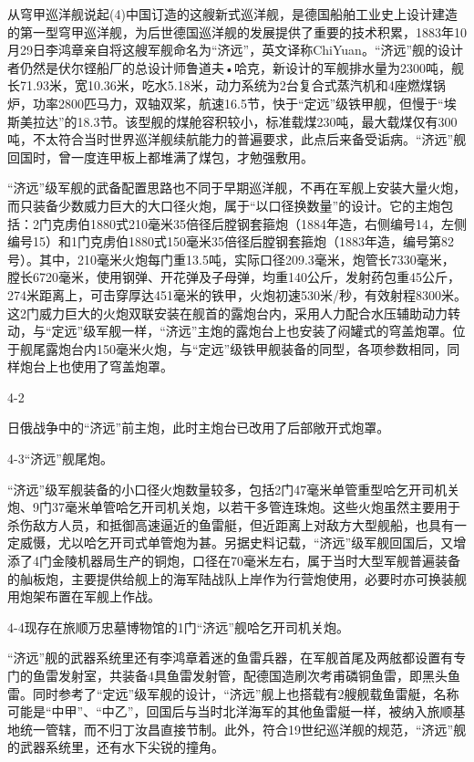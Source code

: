 \documentclass[12pt,UTF8]{ctexbook}
\begin{document}
从穹甲巡洋舰说起(4)中国订造的这艘新式巡洋舰，是德国船舶工业史上设计建造的第一型穹甲巡洋舰，为后世德国巡洋舰的发展提供了重要的技术积累，1883年10月29日李鸿章亲自将这艘军舰命名为“济远”，英文译称ChiYuan。“济远”舰的设计者仍然是伏尔铿船厂的总设计师鲁道夫•哈克，新设计的军舰排水量为2300吨，舰长71.93米，宽10.36米，吃水5.18米，动力系统为2台复合式蒸汽机和4座燃煤锅炉，功率2800匹马力，双轴双桨，航速16.5节，快于“定远”级铁甲舰，但慢于“埃斯美拉达”的18.3节。该型舰的煤舱容积较小，标准载煤230吨，最大载煤仅有300吨，不太符合当时世界巡洋舰续航能力的普遍要求，此点后来备受诟病。“济远”舰回国时，曾一度连甲板上都堆满了煤包，才勉强敷用。

“济远”级军舰的武备配置思路也不同于早期巡洋舰，不再在军舰上安装大量火炮，而只装备少数威力巨大的大口径火炮，属于“以口径换数量”的设计。它的主炮包括：2门克虏伯1880式210毫米35倍径后膛钢套箍炮（1884年造，右侧编号14，左侧编号15）和1门克虏伯1880式150毫米35倍径后膛钢套箍炮（1883年造，编号第82号）。其中，210毫米火炮每门重13.5吨，实际口径209.3毫米，炮管长7330毫米，膛长6720毫米，使用钢弹、开花弹及子母弹，均重140公斤，发射药包重45公斤，274米距离上，可击穿厚达451毫米的铁甲，火炮初速530米/秒，有效射程8300米。这2门威力巨大的火炮双联安装在舰首的露炮台内，采用人力配合水压辅助动力转动，与“定远”级军舰一样，“济远”主炮的露炮台上也安装了闷罐式的穹盖炮罩。位于舰尾露炮台内150毫米火炮，与“定远”级铁甲舰装备的同型，各项参数相同，同样炮台上也使用了穹盖炮罩。

4-2

日俄战争中的“济远”前主炮，此时主炮台已改用了后部敞开式炮罩。

4-3“济远”舰尾炮。

“济远”级军舰装备的小口径火炮数量较多，包括2门47毫米单管重型哈乞开司机关炮、9门37毫米单管哈乞开司机关炮，以若干多管连珠炮。这些火炮虽然主要用于杀伤敌方人员，和抵御高速逼近的鱼雷艇，但近距离上对敌方大型舰船，也具有一定威慑，尤以哈乞开司式单管炮为甚。另据史料记载，“济远”级军舰回国后，又增添了4门金陵机器局生产的铜炮，口径在70毫米左右，属于当时大型军舰普遍装备的舢板炮，主要提供给舰上的海军陆战队上岸作为行营炮使用，必要时亦可换装舰用炮架布置在军舰上作战。

4-4现存在旅顺万忠墓博物馆的1门“济远”舰哈乞开司机关炮。

“济远”舰的武器系统里还有李鸿章着迷的鱼雷兵器，在军舰首尾及两舷都设置有专门的鱼雷发射室，共装备4具鱼雷发射管，配德国造刷次考甫磷铜鱼雷，即黑头鱼雷。同时参考了“定远”级军舰的设计，“济远”舰上也搭载有2艘舰载鱼雷艇，名称可能是“中甲”、“中乙”，回国后与当时北洋海军的其他鱼雷艇一样，被纳入旅顺基地统一管辖，而不归丁汝昌直接节制。此外，符合19世纪巡洋舰的规范，“济远”舰的武器系统里，还有水下尖锐的撞角。
\end{document}
